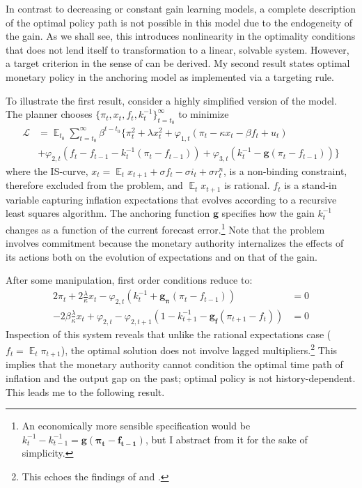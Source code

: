 \documentclass[11pt]{article}
\renewcommand{\[}{\begin{equation}}
\renewcommand{\]}{\end{equation}}
\DeclareMathOperator{\E}{\mathbb{E}}
\begin{document}
In contrast to decreasing or constant gain learning models, a complete description of the optimal policy path is not possible in this model due to the endogeneity of the gain. As we shall see, this introduces nonlinearity in the optimality conditions that does not lend itself to transformation to a linear, solvable system. However, a target criterion in the sense of \cite{woodford2011interest} can be derived. My second result states optimal monetary policy in the anchoring model as implemented via a targeting rule.

To illustrate the first result, consider a highly simplified version of the model. The planner chooses $\{\pi_t, x_t, f_t, k_t^{-1}\}_{t=t_0}^{\infty}$ to minimize
 \begin{align*}
\mathcal{L} &= \E_{t_0}\sum_{t=t_0}^{\infty} \beta^{t-t_0}\bigg\{ \pi_t^2  + \lambda x_t^2 + \varphi_{1,t} (\pi_t -\kappa x_t- \beta f_t +u_t) \\ &+ \varphi_{2,t}(f_t - f_{t-1} -k_t^{-1}(\pi_t - f_{t-1})) + \varphi_{3,t}(k_t^{-1} - \mathbf{g}(\pi_t - f_{t-1})) \bigg\}
 \end{align*}
 where the IS-curve, $x_t = \E_t x_{t+1}+\sigma f_t -\sigma i_t +\sigma r_t^n$, is a non-binding constraint, therefore excluded from the problem, and $\E_t x_{t+1}$ is rational. $f_t$ is a stand-in variable capturing inflation expectations that evolves according to a recursive least squares algorithm. The anchoring function $\mathbf{g}$ specifies how the gain $k_t^{-1}$ changes as a function of the current forecast error.\footnote{An economically more sensible specification would be $k_t^{-1}-k_{t-1}^{-1} = \mathbf{g(\pi_t-f_{t-1})}$, but I abstract from it for the sake of simplicity.} Note that the problem involves commitment because the monetary authority internalizes the effects of its actions both on the evolution of expectations and on that of the gain. 
 
 After some manipulation, first order conditions reduce to:
 \begin{align}
  2\pi_t +2\frac{\lambda}{\kappa}x_t -\varphi_{2,t}(k_t^{-1} + \mathbf{g_{\pi}}(\pi_t -f_{t-1}))& = 0 \label{simpleFOC1} \\
  -2\beta\frac{\lambda}{\kappa}x_t + \varphi_{2,t} -\varphi_{2,t+1}(1-k_{t+1}^{-1} -\mathbf{g_{f}}(\pi_{t+1} -f_{t})) & = 0 \label{simpleFOC2} 
 \end{align}
Inspection of this system reveals that unlike the rational expectations case ($f_t = \E_t{\pi_{t+1}}$), the optimal solution does not involve lagged multipliers.\footnote{This echoes the findings of \cite{molnar2014optimal} and \cite{gaspar2010inflation}.} This implies that the monetary authority cannot condition the optimal time path of inflation and the output gap on the past; optimal policy is not history-dependent. This leads me to the following result.
\end{document}
